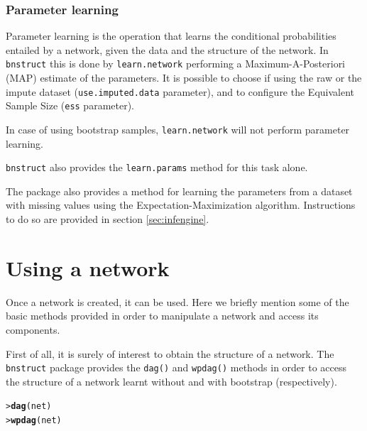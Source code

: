\documentclass{article}\usepackage[]{graphicx}\usepackage[]{color}
\makeatletter
\newcommand{\hlstd}[1]{\textcolor[rgb]{0.345,0.345,0.345}{#1}}%
\newcommand{\hlkwd}[1]{\textcolor[rgb]{0.737,0.353,0.396}{\textbf{#1}}}%
\newenvironment{kframe}{%
 \def\at@end@of@kframe{}%
 \ifinner\ifhmode%
  \def\at@end@of@kframe{\end{minipage}}%
  \begin{minipage}{\columnwidth}%
 \fi\fi%
 \def\FrameCommand##1{\hskip\@totalleftmargin \hskip-\fboxsep
 \colorbox{shadecolor}{##1}\hskip-\fboxsep
     \hskip-\linewidth \hskip-\@totalleftmargin \hskip\columnwidth}%
 \MakeFramed {\advance\hsize-\width
   \@totalleftmargin\z@ \linewidth\hsize
   \@setminipage}}%
 {\par\unskip\endMakeFramed%
 \at@end@of@kframe}
\newenvironment{knitrout}{}{} %
\newcommand{\Robject}[1]{{\texttt{#1}}}
\newcommand{\Rpackage}[1]{{\texttt{#1}}}
\newcommand{\Rmethod}[1]{{\texttt{#1}}}
\newcommand{\Rfunarg}[1]{{\texttt{#1}}}
\makeatother
\begin{document}
\subsubsection{Parameter learning}
Parameter learning is the operation that learns the conditional probabilities entailed by a network,
given the data and the structure of the network. In \Rpackage{bnstruct} this is done by \Rmethod{learn.network}
performing a Maximum-A-Posteriori (MAP) estimate of the parameters. It is possible to choose if using the raw
or the impute dataset (\Rfunarg{use.imputed.data} parameter), and to configure the
Equivalent Sample Size (\Rfunarg{ess} parameter).

In case of using bootstrap samples, \Rmethod{learn.network} will not perform parameter learning.

\Rpackage{bnstruct} also provides the \Rmethod{learn.params} method for this task alone.

The package also provides a method for learning the parameters from a dataset with missing values using the 
Expectation-Maximization algorithm. Instructions to do so are provided in section \ref{sec:infengine}.

% 

\section{Using a network}
Once a network is created, it can be used. Here we briefly mention some of the basic methods provided in order to
manipulate a network and access its components.

First of all, it is surely of interest to obtain the structure of a network. The \Rpackage{bnstruct} package
provides the \Rmethod{dag()} and \Rmethod{wpdag()} methods in order to access the structure of 
a network learnt without and with bootstrap (respectively).
\begin{knitrout}
\color{fgcolor}\begin{kframe}
\begin{alltt}
\hlstd{> }\hlkwd{dag}\hlstd{(net)}
\hlstd{> }\hlkwd{wpdag}\hlstd{(net)}
\end{alltt}
\end{kframe}
\end{knitrout}
\end{document}
